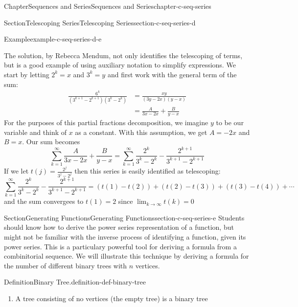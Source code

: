 \documentclass[oneside,10pt,]{book}
\numberwithin{equation}{section}
\begin{document}
\begin{chapterptx}{Chapter}{Sequences and Series}{}{Sequences and Series}{}{}{chapter-c-seq-series}
\begin{sectionptx}{Section}{Telescoping Series}{}{Telescoping Series}{}{}{section-c-seq-series-d}
\begin{example}{Example}{}{example-c-seq-series-d-e}
\par
The solution, by Rebecca Mendum, not only identifies the telescoping of terms, but is a good example of using auxiliary notation to simplify expressions.  We start by letting \(2^k=x\) and \(3^k=y\) and first work with the general term of the sum:%
\begin{equation*}
\begin{split}
\frac{6^k}{(3^{k+1}-2^{k+1})(3^k-2^k)}&=\frac{x y}{(3y-2x)(y-x)}\\
&=\frac{A}{3x-2x} + \frac{B}{y-x}
\end{split}
\end{equation*}
For the purposes of this partial fractions decomposition, we imagine \(y\) to be our variable and think of \(x\) as a constant. With this assumption, we get \(A=-2x\) and \(B=x\). Our sum becomes%
\begin{equation*}
\sum_{k=1}^{\infty} \frac{A}{3x-2x} + \frac{B}{y-x}
=\sum_{k=1}^{\infty} \frac{2^k}{3^k-2^k} - \frac{2^{k+1}}{3^{k+1}-2^{k+1}}
\end{equation*}
If we let \(t(j)=\frac{2^j}{3^j-2^j}\) then this series is easily identified as telescoping:%
\begin{equation*}
\sum_{k=1}^{\infty} \frac{2^k}{3^k-2^k} - \frac{2^{k+1}}{3^{k+1}-2^{k+1}}=(t(1)-t(2))+(t(2)-t(3))+(t(3)-t(4))+\cdots
\end{equation*}
and the sum convergees to \(t(1)=2\) since \(\lim_{k\rightarrow \infty} t(k)=0\)%
\end{example}
\end{sectionptx}
%
%
\typeout{************************************************}
\typeout{************************************************}
%
\begin{sectionptx}{Section}{Generating Functions}{}{Generating Functions}{}{}{section-c-seq-series-e}
%
Students should know how to derive the power series representation of a function, but might not be familiar with the inverse process of identifying  a function, given its power series.   This is a particulary powerful tool for deriving a formula from a combinitorial sequence. We will illustrate this technique by deriving a formula for the number of different binary trees with \(n\) vertices.%
\begin{definition}{Definition}{Binary Tree.}{definition-def-binary-tree}%
%
%
\begin{enumerate}[label=(\arabic*)]
\item{}A tree consisting of no vertices (the empty tree) is a binary tree%

\end{enumerate}
\end{definition}
\end{sectionptx}
\end{chapterptx}
\end{document}
